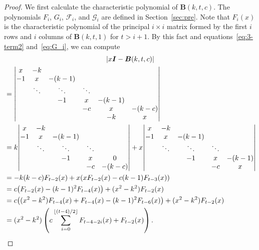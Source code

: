 \documentclass[10pt]{amsart}
\begin{document}
\begin{proof}
We first calculate 
the characteristic polynomial of $\boldsymbol{B}(k,t,c)$. 
The polynomials $F_i$, $G_i$, $\mathscr{F}_i$, and $\mathscr{G}_i$ are defined in Section~\ref{sec:pre}. 
Note that $F_i(x)$ is the characteristic polynomial of the principal $i \times i$ matrix formed by the first 
$i$ rows and $i$ columns of $\boldsymbol{B}(k,t,1)$ for $t>i+1$. 
By this fact and equations~\eqref{eq:3-term2} and~\eqref{eq:G_i}, we can compute 
\begin{multline*}
|x \boldsymbol{I}-\boldsymbol{B}(k,t,c)|\\
\begin{aligned}
&={%
\begin{vmatrix}
x & -k & & & & \\
-1 & x & -(k-1) & & & \\
 & \ddots & \ddots & \ddots & & \\
 & &-1 & x & -(k-1)& \\
 & & & -c & x & -(k-c) \\
 & & & & -k & x 
\end{vmatrix}}\\
&=k {%
\begin{vmatrix}
x & -k & & & \\
-1 & x & -(k-1) & & \\
 & \ddots & \ddots & \ddots & \\
 & &-1 & x & 0 \\
 & & & -c & -(k-c) \\ 
\end{vmatrix}}+x{%
\begin{vmatrix}
x & -k & & & \\
-1 & x & -(k-1) & & \\
 & \ddots & \ddots & \ddots & \\
 & &-1 & x & -(k-1) \\
 & & & -c & x 
\end{vmatrix}}\\
&=-k(k-c)F_{t-2}(x)+x(x F_{t-2}(x)-c(k-1)F_{t-3}(x))\\
&= c\big(F_{t-2}(x)-(k-1)^2 F_{t-4}(x)\big)+(x^2-k^2)F_{t-2}(x)\\
&= c\big((x^2-k^2)F_{t-4}(x)+F_{t-4}(x)-(k-1)^2 F_{t-6}(x)\big)+(x^2-k^2)F_{t-2}(x)\\
&= (x^2-k^2)\left(c\sum_{i=0}^{ \lfloor (t-4)/2 \rfloor}F_{t-4-2i}(x)+F_{t-2}(x)\right).

\end{aligned}
\end{multline*}
\end{proof}
\end{document}
